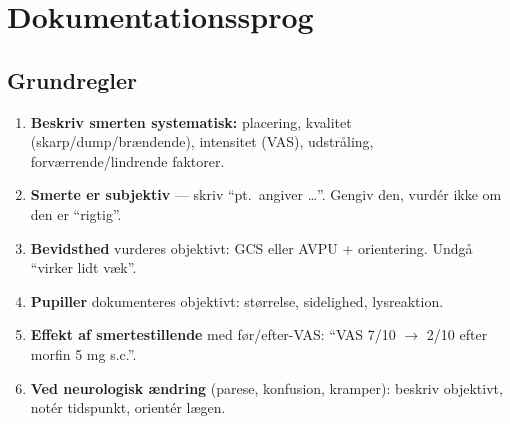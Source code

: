 \documentclass[11pt,a4paper]{report}
\begin{document}
\section{Dokumentationssprog}
\subsection{Grundregler}
\begin{enumerate}[leftmargin=1.4em,itemsep=4pt]
\item \textbf{Beskriv smerten systematisk:} placering, kvalitet (skarp/dump/brændende), intensitet (VAS), udstråling, forværrende/lindrende faktorer.
\item \textbf{Smerte er subjektiv} --- skriv ``pt.\ angiver \ldots''. Gengiv den, vurdér ikke om den er ``rigtig''.
\item \textbf{Bevidsthed} vurderes objektivt: GCS eller AVPU + orientering. Undgå ``virker lidt væk''.
\item \textbf{Pupiller} dokumenteres objektivt: størrelse, sidelighed, lysreaktion.
\item \textbf{Effekt af smertestillende} med før/efter-VAS: ``VAS 7/10 $\rightarrow$ 2/10 efter morfin 5 mg s.c.''.
\item \textbf{Ved neurologisk ændring} (parese, konfusion, kramper): beskriv objektivt, notér tidspunkt, orientér lægen.
\end{enumerate}
\end{document}
